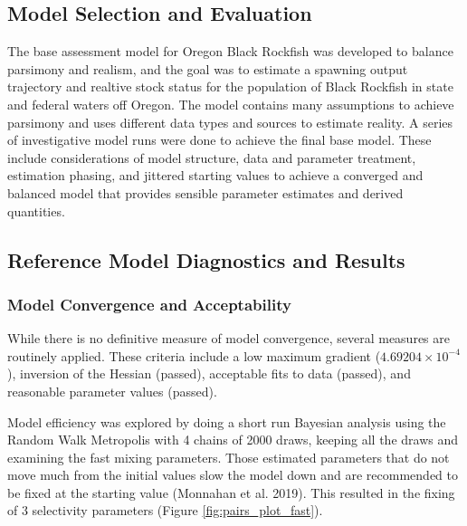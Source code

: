 \documentclass[11pt,
  english,
  letterpaper,
]{article}
\begin{document}
\hypertarget{model-selection-and-evaluation}{%
\subsection{Model Selection and Evaluation}\label{model-selection-and-evaluation}}

The base assessment model for Oregon Black Rockfish was developed to balance parsimony and realism, and the goal was to estimate a spawning output trajectory and realtive stock status for the population of Black Rockfish in state and federal waters off Oregon. The model contains many assumptions to achieve parsimony and uses different data types and sources to estimate reality. A series of investigative model runs were done to achieve the final base model. These include considerations of model structure, data and parameter treatment, estimation phasing, and jittered starting values to achieve a converged and balanced model that provides sensible parameter estimates and derived quantities.

\hypertarget{reference-model-diagnostics-and-results}{%
\subsection{Reference Model Diagnostics and Results}\label{reference-model-diagnostics-and-results}}

\hypertarget{model-convergence-and-acceptability}{%
\subsubsection{Model Convergence and Acceptability}\label{model-convergence-and-acceptability}}

While there is no definitive measure of model convergence, several measures are routinely applied. These criteria include a low maximum gradient (\ensuremath{4.69204\times 10^{-4}}), inversion of the Hessian (passed), acceptable fits to data (passed), and reasonable parameter values (passed).

Model efficiency was explored by doing a short run Bayesian analysis using the Random Walk Metropolis with 4 chains of 2000 draws, keeping all the draws and examining the fast mixing parameters. Those estimated parameters that do not move much from the initial values slow the model down and are recommended to be fixed at the starting value (Monnahan et al. 2019). This resulted in the fixing of 3 selectivity parameters (Figure \ref{fig:pairs_plot_fast}).
\end{document}
